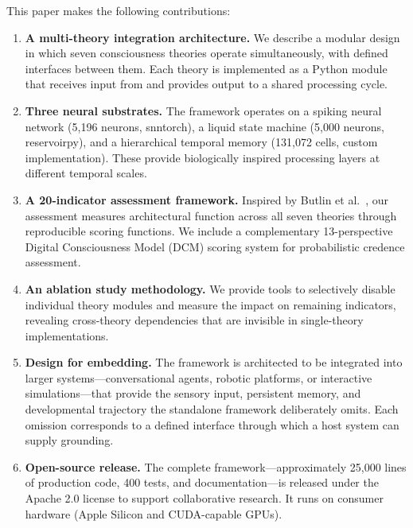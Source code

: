 This paper makes the following contributions:

\begin{enumerate}
    \item \textbf{A multi-theory integration architecture.} We describe a modular design in which seven consciousness theories operate simultaneously, with defined interfaces between them. Each theory is implemented as a Python module that receives input from and provides output to a shared processing cycle.

    \item \textbf{Three neural substrates.} The framework operates on a spiking neural network (5,196 neurons, snntorch), a liquid state machine (5,000 neurons, reservoirpy), and a hierarchical temporal memory (131,072 cells, custom implementation). These provide biologically inspired processing layers at different temporal scales.

    \item \textbf{A 20-indicator assessment framework.} Inspired by Butlin et al.\ \cite{butlin2023}, our assessment measures architectural function across all seven theories through reproducible scoring functions. We include a complementary 13-perspective Digital Consciousness Model (DCM) scoring system for probabilistic credence assessment.

    \item \textbf{An ablation study methodology.} We provide tools to selectively disable individual theory modules and measure the impact on remaining indicators, revealing cross-theory dependencies that are invisible in single-theory implementations.

    \item \textbf{Design for embedding.} The framework is architected to be integrated into larger systems---conversational agents, robotic platforms, or interactive simulations---that provide the sensory input, persistent memory, and developmental trajectory the standalone framework deliberately omits. Each omission corresponds to a defined interface through which a host system can supply grounding.

    \item \textbf{Open-source release.} The complete framework---approximately 25,000 lines of production code, 400 tests, and documentation---is released under the Apache 2.0 license to support collaborative research. It runs on consumer hardware (Apple Silicon and CUDA-capable GPUs).
\end{enumerate}

